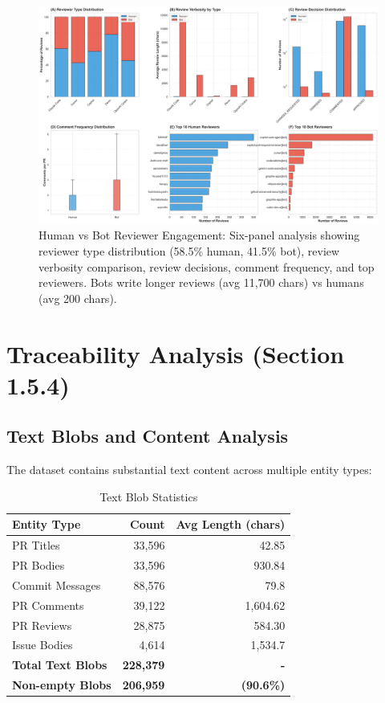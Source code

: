 \documentclass[11pt]{article}
\begin{document}
\begin{figure}[H]
\centering
\includegraphics[width=\textwidth]{figures/fig5_human_vs_bot_engagement.png}
\caption{Human vs Bot Reviewer Engagement: Six-panel analysis showing reviewer type distribution (58.5\% human, 41.5\% bot), review verbosity comparison, review decisions, comment frequency, and top reviewers. Bots write longer reviews (avg 11,700 chars) vs humans (avg 200 chars).}
\label{fig:human_bot}
\end{figure}

\section{Traceability Analysis (Section 1.5.4)}

\subsection{Text Blobs and Content Analysis}

The dataset contains substantial text content across multiple entity types:

\begin{table}[H]
\centering
\caption{Text Blob Statistics}
\label{tab:text_blobs}
\begin{tabular}{@{}lrr@{}}
\toprule
\textbf{Entity Type} & \textbf{Count} & \textbf{Avg Length (chars)} \\
\midrule
PR Titles & 33,596 & 42.85 \\
PR Bodies & 33,596 & 930.84 \\
Commit Messages & 88,576 & 79.8 \\
PR Comments & 39,122 & 1,604.62 \\
PR Reviews & 28,875 & 584.30 \\
Issue Bodies & 4,614 & 1,534.7 \\
\midrule
\textbf{Total Text Blobs} & \textbf{228,379} & \textbf{-} \\
\textbf{Non-empty Blobs} & \textbf{206,959} & \textbf{(90.6\%)} \\
\bottomrule
\end{tabular}
\end{table}
\end{document}
